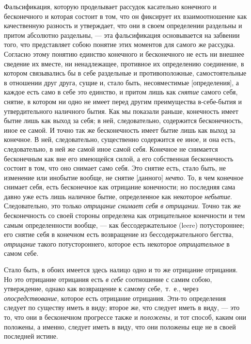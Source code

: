 Фальсификация, которую проделывает рассудок касательно конечного и
бесконечного и которая состоит в том, что он фиксирует их взаимоотношение
как качественную разность и утверждает, что они в своем определении
раздельны и притом абсолютно раздельны, — эта фальсификация основывается на
забвении того, что представляет собою понятие этих моментов для самого же
рассудка. Согласно этому понятию единство конечного и бесконечного не есть
ни внешнее сведение их вместе, ни ненадлежащее, противное их определению
соединение, в котором связывались бы в себе раздельные и противоположные,
самостоятельные в отношении друг друга, сущие и, стало быть, несовместимые
[определения], а каждое есть само в себе это единство, и притом лишь как
{\em снятие} самого себя, снятие, в котором ни одно не
имеет перед другим преимущества в-себе-бытия и утвердительного наличного
бытия. Как мы показали раньше, конечность имеет бытие лишь как выход за
себя; в ней, следовательно, содержится бесконечность, иное ее самой. И
точно так же бесконечность имеет бытие лишь как выход за конечное. В ней,
следовательно, существенно содержится ее иное, и она есть, следовательно,
в ней же самой иное самой себя. Конечное не снимается бесконечным как вне
его имеющейся силой, а его собственная бесконечность состоит в том, что оно
снимает само себя. Это снятие есть, стало быть, не изменение или инобытие
вообще, не снятие [данного] {\em нечто}. То, в чем
конечное снимает себя, есть бесконечное как отрицание конечности; но
последняя сама давно уже есть лишь наличное бытие, определенное как
некоторое {\em небытие}. Следовательно, это только
{\em отрицание снимает себя в отрицании}. Точно так же
бесконечность со своей стороны определена как отрицательное конечности и
тем самым определенности вообще, — как бессодержательное (leere)
потустороннее; его снятие себя в конечном есть возвращение из
бессодержательного бегства, {\em отрицание} такого
потустороннего, которое есть некоторое
{\em отрицательное} в самом себе.

Стало быть, в обоих имеется здесь налицо одно и то же отрицание отрицания.
Но это отрицание отрицания есть {\em в себе}
соотношение с самим собою, утверждение, однако как возвращение к самому
себе,~т.~е., через {\em опосредствование}, которое есть
отрицание отрицания. Эти-то определения следует по существу иметь в виду;
второе же, что следует иметь в виду, — это то, что они в бесконечном
прогрессе также и {\em положены}, и тот способ, каким
они положены, а именно, следует иметь в виду, что они положены еще не в
своей последней истине.

